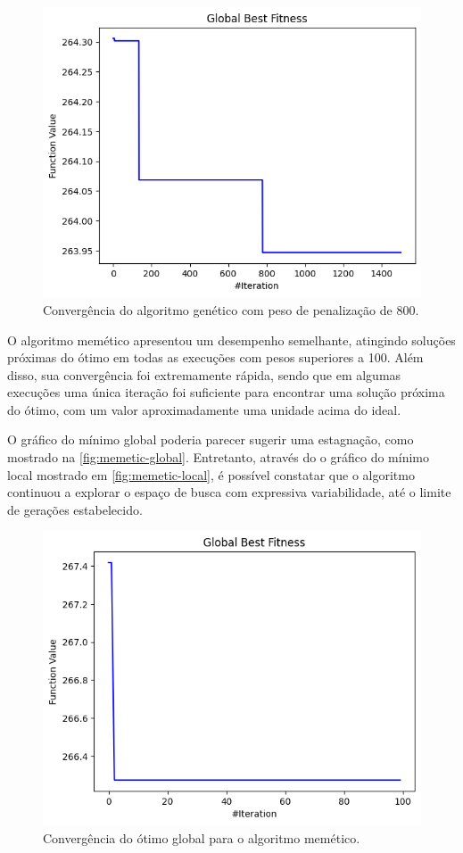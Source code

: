 \begin{figure}
    \centering
    \includegraphics[width=.6\linewidth]{images/weight/800.png}
    \caption{Convergência do algoritmo genético com peso de penalização de 800.}%
    \label{fig:ga-weight-800}
\end{figure}

O algoritmo memético apresentou um desempenho semelhante, atingindo soluções próximas do ótimo em todas as execuções com pesos superiores a 100.
Além disso, sua convergência foi extremamente rápida, sendo que em algumas execuções uma única iteração foi suficiente para encontrar uma solução próxima do ótimo, com um valor aproximadamente uma unidade acima do ideal.

O gráfico do mínimo global poderia parecer sugerir uma estagnação, como mostrado na \autoref{fig:memetic-global}.
Entretanto, através do o gráfico do mínimo local mostrado em \autoref{fig:memetic-local}, é possível constatar que o algoritmo continuou a explorar o espaço de busca com expressiva variabilidade, até o limite de gerações estabelecido.

\begin{figure}
    \centering
    \includegraphics[width=.6\linewidth]{images/convergence/gdbf.png}
    \caption{Convergência do ótimo global para o algoritmo memético.}%
    \label{fig:memetic-global}
\end{figure}

